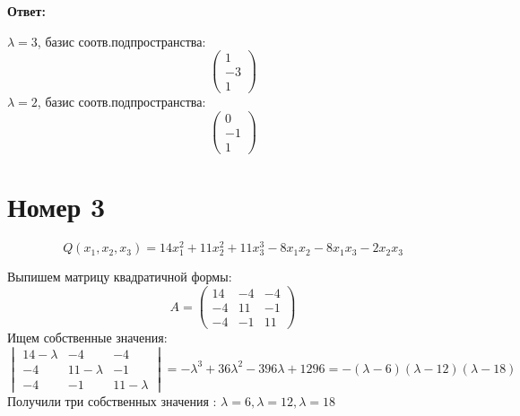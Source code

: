 \documentclass[a4paper,12pt]{article}
\begin{document}
\begin{center}
\textbf{Ответ: } 

$\lambda = 3$, базис соотв.подпространства: 
\[
\begin{pmatrix}
1 \\ -3 \\ 1
\end{pmatrix}
\]
$\lambda = 2$, базис соотв.подпространства:  
\[
\begin{pmatrix}
0 \\ -1 \\ 1
\end{pmatrix}
\]
\end{center}
\clearpage
\section*{Номер 3}
\[
Q(x_1, x_2, x_3) = 14x_1^2 + 11x_2^2 + 11x_3^3 - 8x_1x_2 - 8x_1x_3 - 2x_2x_3
\]

Выпишем матрицу квадратичной формы:
\[
A = \begin{pmatrix}
14 & -4& -4 \\
-4 & 11 & -1 \\
-4 & -1 & 11
\end{pmatrix}
\]
Ищем собственные значения:
\[
\begin{vmatrix}
14 - \lambda& -4& -4 \\
-4 & 11 - \lambda & -1 \\
-4 & -1 & 11 - \lambda 
\end{vmatrix} = -\lambda^3 + 36\lambda^2 - 396\lambda + 1296 = -(\lambda - 6)(\lambda  -12)(\lambda - 18)
\]
Получили три собственных значения : $\lambda = 6, \lambda = 12, \lambda = 18$
\end{document}
